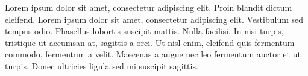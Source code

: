 \documentclass{carver-cyberlaw}
\begin{document}
Lorem ipsum dolor sit amet, consectetur adipiscing elit. Proin blandit dictum eleifend. Lorem ipsum dolor sit amet, consectetur adipiscing elit. Vestibulum sed tempus odio. Phasellus lobortis suscipit mattis. Nulla facilisi. In nisi turpis, tristique ut accumsan at, sagittis a orci. Ut nisl enim, eleifend quis fermentum commodo, fermentum a velit. Maecenas a augue nec leo fermentum auctor et ut turpis. Donec ultricies ligula sed mi suscipit sagittis.
\end{document}
